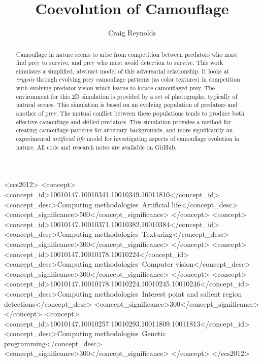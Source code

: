 \documentclass[sigconf]{acmart}
\begin{document}
\title{Coevolution of Camouflage}

\author{Craig Reynolds}

\renewcommand{\shortauthors}{Craig Reynolds}

\begin{abstract}
  Camouflage in nature seems to arise from competition between predators who must find prey to survive, and prey who must avoid detection to survive. This work simulates a simplified, abstract model of this adversarial relationship. It looks at \textit{crypsis} through evolving prey camouflage patterns (as color textures) in competition with evolving predator vision which learns to locate camouflaged prey. The environment for this 2D simulation is provided by a set of photographs, typically of natural scenes. This simulation is based on an evolving population of predators and another of prey. The mutual conflict between these populations tends to produce both effective camouflage and skilled predators. This simulation provides a method for creating camouflage patterns for arbitrary backgrounds, and more significantly an experimental \textit{artificial life} model for investigating aspects of camouflage evolution in nature. All code and research notes are available on GitHub.
\end{abstract}

\begin{CCSXML}
<ccs2012>
   <concept>
       <concept_id>10010147.10010341.10010349.10011810</concept_id>
       <concept_desc>Computing methodologies~Artificial life</concept_desc>
       <concept_significance>500</concept_significance>
       </concept>
   <concept>
       <concept_id>10010147.10010371.10010382.10010384</concept_id>
       <concept_desc>Computing methodologies~Texturing</concept_desc>
       <concept_significance>300</concept_significance>
       </concept>
   <concept>
       <concept_id>10010147.10010178.10010224</concept_id>
       <concept_desc>Computing methodologies~Computer vision</concept_desc>
       <concept_significance>300</concept_significance>
       </concept>
    <concept>
       <concept_id>10010147.10010178.10010224.10010245.10010246</concept_id>
       <concept_desc>Computing methodologies~Interest point and salient region detections</concept_desc>
       <concept_significance>300</concept_significance>
       </concept>
    <concept>
        <concept_id>10010147.10010257.10010293.10011809.10011813</concept_id>
        <concept_desc>Computing methodologies~Genetic programming</concept_desc>
        <concept_significance>300</concept_significance>
    </concept>
 </ccs2012>
\end{CCSXML}
\end{document}
